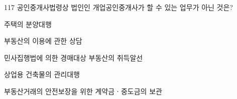 \begin{question}{117}
공인중개사법령상 법인인 개업공인중개사가 할 수 있는 업무가 아닌 것은?
\begin{choices}
  \item 주택의 분양대행
  \item 부동산의 이용에 관한 상담
  \item 민사집행법에 의한 경매대상 부동산의 취득알선
  \item 상업용 건축물의 관리대행
  \item 부동산거래의 안전보장을 위한 계약금ㆍ중도금의 보관
\end{choices}
\end{question}
